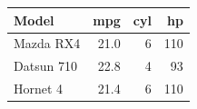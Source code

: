 \begin{table}
\centering\begingroup\fontsize{8}{10}\selectfont

\begin{tabular}{lrrr}
\toprule
Model & mpg & cyl & hp\\
\midrule
Mazda RX4 & 21.0 & 6 & 110\\
Datsun 710 & 22.8 & 4 & 93\\
Hornet 4 & 21.4 & 6 & 110\\
\bottomrule
\end{tabular}
\endgroup{}
\end{table}
